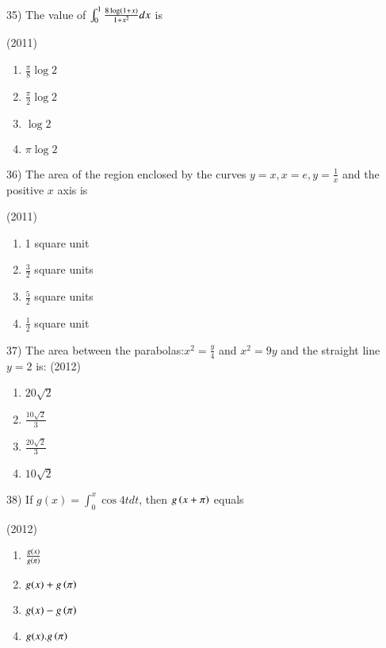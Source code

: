 \documentclass[journal,12pt,twocolumn]{IEEEtran}
\theoremstyle{remark}
\begin{document}
35)
	 The value of $\int_0^1\frac{8\log\left(1+x\right)}{1+x^2}dx$ is

		\hfill{(2011)}

		\begin{multicols}{2}
			\begin{enumerate}[label=(\alph*)]
				\item $\frac{\pi}{8}\log2$
				\item $\frac{\pi}{2}\log2$
				\item $\log 2$
				\item $\pi \log2$
			\end{enumerate}
		\end{multicols}

36)
	 The area of the region enclosed by the curves $y=x, x=e, y=\frac{1}{x}$ and the positive $x$ axis is

		\hfill{(2011)}

		\begin{multicols}{2}
			\begin{enumerate}[label=(\alph*)]
				\item 1 square unit
				\item $\frac{3}{2}$ square units
				\item $\frac{5}{2}$ square units
				\item $\frac{1}{2}$ square unit
			\end{enumerate}
		\end{multicols}

37)
	 The area between the parabolas:$x^2=\frac{y}{4}$ and $x^2=9y$ and the straight line $y=2$ is:
		\hfill{(2012)}

		\begin{multicols}{4}
			\begin{enumerate}[label=(\alph*)]
				\item $20\sqrt{2}$
				\item $\frac{10\sqrt{2}}{3}$
				\item $\frac{20\sqrt{2}}{3}$
				\item $10\sqrt{2}$
			\end{enumerate}
		\end{multicols}

38)
	 If $g(x)=\int_0^x\cos 4t dt$, then $g\left(x+\pi\right)$ equals

		\hfill{(2012)}

		\begin{multicols}{2}
			\begin{enumerate}[label=(\alph*)]
				\item $\frac{g(x)}{g\left(\pi\right)}$
				\item $g(x)+g\left(\pi\right)$
				\item $g(x)-g\left(\pi\right)$
				\item $g(x).g\left(\pi\right)$
			\end{enumerate}
		\end{multicols}
\end{document}
